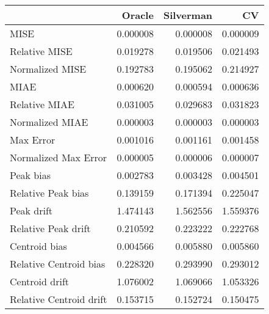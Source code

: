 \begin{tabular}{lrrr}
  \hline
 & Oracle & Silverman & CV \\ 
  \hline
MISE & 0.000008 & 0.000008 & 0.000009 \\ 
  Relative MISE & 0.019278 & 0.019506 & 0.021493 \\ 
  Normalized MISE & 0.192783 & 0.195062 & 0.214927 \\ 
  MIAE & 0.000620 & 0.000594 & 0.000636 \\ 
  Relative MIAE & 0.031005 & 0.029683 & 0.031823 \\ 
  Normalized MIAE & 0.000003 & 0.000003 & 0.000003 \\ 
  Max Error & 0.001016 & 0.001161 & 0.001458 \\ 
  Normalized Max Error & 0.000005 & 0.000006 & 0.000007 \\ 
  Peak bias & 0.002783 & 0.003428 & 0.004501 \\ 
  Relative Peak bias & 0.139159 & 0.171394 & 0.225047 \\ 
  Peak drift & 1.474143 & 1.562556 & 1.559376 \\ 
  Relative Peak drift & 0.210592 & 0.223222 & 0.222768 \\ 
  Centroid bias & 0.004566 & 0.005880 & 0.005860 \\ 
  Relative Centroid bias & 0.228320 & 0.293990 & 0.293012 \\ 
  Centroid drift & 1.076002 & 1.069066 & 1.053326 \\ 
  Relative Centroid drift & 0.153715 & 0.152724 & 0.150475 \\ 
   \hline
\end{tabular}

